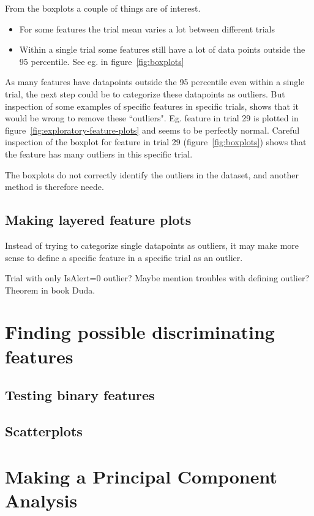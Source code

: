 From the boxplots a couple of things are of interest.
\begin{itemize}
    \item For some features the trial mean varies a lot between different trials 
    \item Within a single trial some features still have a lot of data points outside the 95 percentile. See eg.  in figure~\ref{fig:boxplots} 
\end{itemize}
As many features have datapoints outside the 95 percentile even within a single trial, the next step could be to categorize these datapoints as outliers. But inspection of some examples of specific features in specific trials, shows that it would be wrong to remove these ``outliers". Eg. feature  in trial 29 is plotted in figure~\ref{fig:exploratory-feature-plots} and seems to be perfectly normal. Careful inspection of the boxplot for feature  in trial 29 (figure~\ref{fig:boxplots}) shows that the feature has many outliers in this specific trial. \par
The boxplots do not correctly identify the outliers in the dataset, and another method is therefore neede.

\subsection{Making layered feature plots}
Instead of trying to categorize single datapoints as outliers, it may make more sense to define a specific feature in a specific trial as an outlier.

 Trial with only IsAlert=0 outlier? Maybe mention troubles with defining outlier? Theorem in book Duda.
\section{Finding possible discriminating features}
\subsection{Testing binary features}
\subsection{Scatterplots}\label{sec:scatterplots}

\section{Making a Principal Component Analysis}
